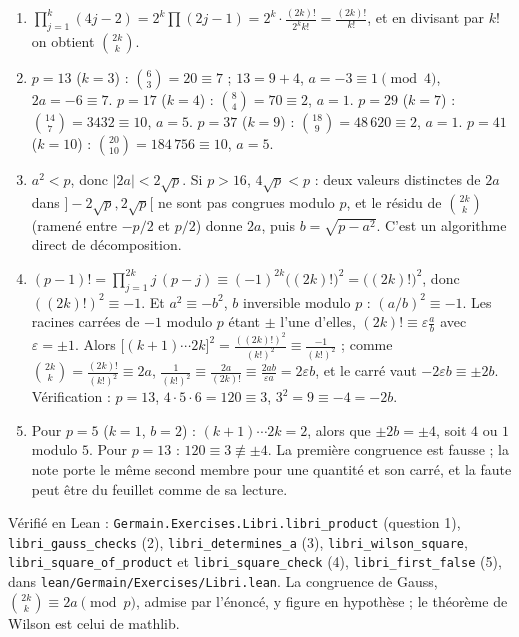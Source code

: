 \documentclass[11pt,a4paper]{article}
\begin{document}
\begin{solution}
\begin{enumerate}
\item $\prod_{j=1}^k(4j - 2) = 2^k\prod(2j-1) = 2^k\cdot\frac{(2k)!}{2^kk!} =
  \frac{(2k)!}{k!}$, et en divisant par $k!$ on obtient $\binom{2k}{k}$.
\item $p = 13$ ($k = 3$) : $\binom63 = 20 \equiv 7$ ; $13 = 9 + 4$, $a = -3 \equiv 1
  \pmod 4$, $2a = -6 \equiv 7$. $p = 17$ ($k = 4$) : $\binom84 = 70 \equiv 2$, $a = 1$.
  $p = 29$ ($k = 7$) : $\binom{14}7 = 3432 \equiv 10$, $a = 5$. $p = 37$ ($k = 9$) :
  $\binom{18}{9} = 48\,620 \equiv 2$, $a = 1$. $p = 41$ ($k = 10$) :
  $\binom{20}{10} = 184\,756 \equiv 10$, $a = 5$.
\item $a^2 < p$, donc $|2a| < 2\sqrt p$. Si $p > 16$, $4\sqrt p < p$ : deux valeurs
  distinctes de $2a$ dans $]-2\sqrt p, 2\sqrt p[$ ne sont pas congrues modulo $p$, et
  le résidu de $\binom{2k}k$ (ramené entre $-p/2$ et $p/2$) donne $2a$, puis
  $b = \sqrt{p - a^2}$. C'est un algorithme direct de décomposition.
\item $(p-1)! = \prod_{j=1}^{2k}j\,(p - j) \equiv (-1)^{2k}\bigl((2k)!\bigr)^2 =
  \bigl((2k)!\bigr)^2$, donc $((2k)!)^2 \equiv -1$. Et $a^2 \equiv -b^2$, $b$ inversible
  modulo $p$ : $(a/b)^2 \equiv -1$. Les racines carrées de $-1$ modulo $p$ étant
  $\pm$ l'une d'elles, $(2k)! \equiv \varepsilon\frac ab$ avec $\varepsilon = \pm1$. Alors
  $\bigl[(k+1)\cdots2k\bigr]^2 = \frac{((2k)!)^2}{(k!)^2} \equiv \frac{-1}{(k!)^2}$ ;
  comme $\binom{2k}{k} = \frac{(2k)!}{(k!)^2} \equiv 2a$,
  $\frac{1}{(k!)^2} \equiv \frac{2a}{(2k)!} \equiv \frac{2a b}{\varepsilon a} = 2\varepsilon b$,
  et le carré vaut $-2\varepsilon b \equiv \pm2b$. Vérification : $p = 13$, $4\cdot5\cdot6 =
  120 \equiv 3$, $3^2 = 9 \equiv -4 = -2b$.
\item Pour $p = 5$ ($k = 1$, $b = 2$) : $(k+1)\cdots2k = 2$, alors que $\pm2b = \pm4$,
  soit $4$ ou $1$ modulo $5$. Pour $p = 13$ : $120 \equiv 3 \not\equiv \pm 4$. La
  première congruence est fausse ; la note porte le même second membre pour une
  quantité et son carré, et la faute peut être du feuillet comme de sa lecture.
\end{enumerate}

Vérifié en Lean : \texttt{Germain.Exercises.Libri.libri\_product} (question 1),
\texttt{libri\_gauss\_checks} (2), \texttt{libri\_determines\_a} (3),
\texttt{libri\_wilson\_square}, \texttt{libri\_square\_of\_product} et \texttt{libri\_square\_check}
(4), \texttt{libri\_first\_false} (5), dans \texttt{lean/Germain/Exercises/Libri.lean}. La congruence de Gauss,
$\binom{2k}{k} \equiv 2a \pmod p$, admise par l'énoncé, y figure en hypothèse ; le théorème de
Wilson est celui de mathlib.
\end{solution}
\end{document}
